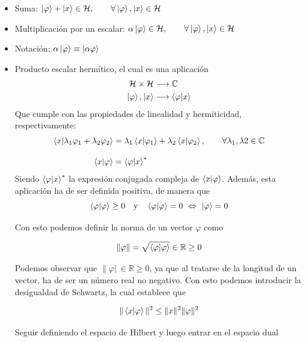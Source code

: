 \documentclass{article}
\numberwithin{equation}{section} %
\begin{document}
    \begin{itemize}
        \item Suma: \( \ket{\varphi} + \ket{x} \in \mathcal{H}, \qquad \forall \ket{\varphi}, \ket{x} \in \mathcal{H} \)
        \item Multiplicación por un escalar: \( \alpha \ket{\varphi} \in \mathcal{H}, \qquad \forall \ket{\varphi}, \ket{x} \in \mathcal{H} \)
        \item Notación: \( \alpha \ket{\varphi} \equiv \ket{\alpha \varphi} \)
        \item Producto escalar hermítico, el cual es una aplicación
            \begin{align*}
                \mathcal{H} \times \mathcal{H} &\longrightarrow \mathbb{C} \\
                \ket{\varphi}, \ket{x} &\longrightarrow \braket{\varphi | x}
            \end{align*}
            Que cumple con las propiedades de linealidad y hermiticidad, respectivamente:
            \begin{align*}
                \braket{x | \lambda_{1}\varphi_{1} + \lambda_{2}\varphi_{2}} &= \lambda_{1} \braket{x | \varphi_{1}} + \lambda_{2} \braket{x | \varphi_{2}}, \qquad \forall \lambda_{1}, \lambda{2} \in \mathbb{C} \\[10pt]
                \braket{x | \varphi} &= \braket{\varphi | x}^{*}
            \end{align*}
            \vspace{2mm}
            Siendo \( \braket{\varphi | x}^{*} \) la expresión conjugada compleja de \( \braket{x | \varphi} \). Además, esta aplicación ha de ser definida positiva, de manera que
            \begin{equation*}
                \braket{\varphi | \varphi} \geq 0 \quad \text{y} \quad \braket{\varphi | \varphi} = 0 \ \Leftrightarrow \ \ket{\varphi} = 0
            \end{equation*}

            Con esto podemos definir la norma de un vector \( \varphi \) como

            \begin{equation*}
                \| \varphi \| = \sqrt{\braket{\varphi | \varphi}} \in \mathbb{R} \geq 0
            \end{equation*}

            Podemos observar que \( \| \varphi |\ \in \mathbb{R} \geq 0 \), ya que al tratarse de la longitud de un vector, ha de ser un número real no negativo. Con esto podemos introducir la desigualdad de Schwartz, la cual establece que 

            \begin{equation*}
                \| \braket{x | \varphi} \| ^{2} \leq \| x \| ^{2} \| \varphi \|^{2}
            \end{equation*}

            Seguir definiendo el espacio de Hilbert y luego entrar en el espacio dual
    \end{itemize}
\end{document}
